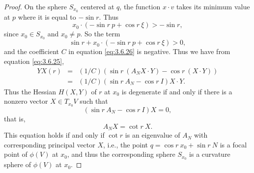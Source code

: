 \documentclass[10pt,a4paper]{amsart}
\begin{document}
\begin{proof}
On the sphere
$S_{x_0}$ centered at $q$, the function $x \cdot v$ takes its minimum value at $p$ where it is equal to $- \sin r$.  Thus
\begin{equation}
\label{eq:3.6.28}
x_0 \cdot ( -\sin r\  p + \cos r\  \xi) > - \sin r,
\end{equation}
since $x_0 \in S_{x_0}$ and $x_0 \neq p$.  So the term
\begin{equation}
\label{eq:3.6.29}
\sin r + x_0 \cdot ( -\sin r\  p + \cos r\  \xi) > 0,
\end{equation}
and the coefficient $C$ in equation \eqref{eq:3.6.26} is negative.  Thus we have from equation \eqref{eq:3.6.25},
\begin{eqnarray}
\label{eq:3.6.30}
YX(r) &=& (1/C) (\sin r \ (A_N X \cdot Y) - \cos r \ (X \cdot Y))\\
 &=& (1/C) (\sin r \ A_N - \cos r \ I) X \cdot Y.\nonumber
\end{eqnarray}
Thus the Hessian $H(X,Y)$ of $r$ at $x_0$ is degenerate if and only if there is a nonzero vector $X \in T_{x_0} V$
such that 
\begin{equation}
\label{eq:3.6.31}
(\sin r \ A_N - \cos r \ I) X = 0,
\end{equation}
that is,
\begin{equation}
\label{eq:3.6.32}
A_N X = \cot r \ X.
\end{equation}
This equation holds if and only if
$\cot r$ is an eigenvalue of $A_N$ with corresponding principal vector $X$, i.e., the point
$q = \cos r\  x_0 + \sin r\  N$ is a focal point of $\phi (V)$ at $x_0$, and thus the corresponding sphere $S_{x_0}$ is
a curvature sphere of $\phi (V)$ at $x_0$. 
\end{proof}
\end{document}
